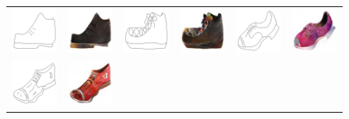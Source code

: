 \begin{figure}
\begin{center}
\begin{tabular}{cccccc}
\includegraphics[width=0.167\linewidth]{figs/shoes_sketches_lotsofresults_latex/input_14974.jpg} &
\includegraphics[width=0.167\linewidth]{figs/shoes_sketches_lotsofresults_latex/L1cGAN_14974.jpg} \hspace{0.025in} &
\includegraphics[width=0.167\linewidth]{figs/shoes_sketches_lotsofresults_latex/input_14985.jpg} &
\includegraphics[width=0.167\linewidth]{figs/shoes_sketches_lotsofresults_latex/L1cGAN_14985.jpg} \hspace{0.025in} &

\includegraphics[width=0.167\linewidth]{figs/shoes_sketches_lotsofresults_latex/input_15023.jpg} &
\includegraphics[width=0.167\linewidth]{figs/shoes_sketches_lotsofresults_latex/L1cGAN_15023.jpg} \\
\includegraphics[width=0.167\linewidth]{figs/shoes_sketches_lotsofresults_latex/input_15035.jpg} &
\includegraphics[width=0.167\linewidth]{figs/shoes_sketches_lotsofresults_latex/L1cGAN_15035.jpg} \hspace{0.025in} &


\end{tabular}
\end{center}
\end{figure}
